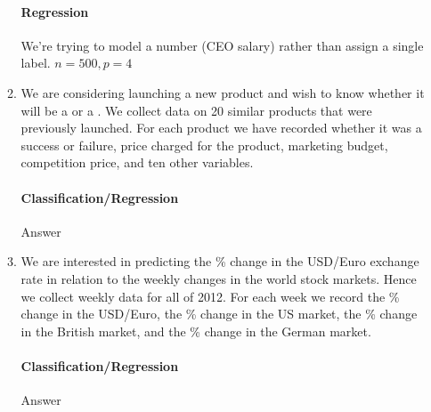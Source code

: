 \documentclass[12pt]{article}
\begin{document}
\begin{enumerate}
\begin{enumerate}
  \paragraph{Regression} We're trying to model a number (CEO salary) rather than
        assign a single label. $n = 500, p = 4$

  \item We are considering launching a new product and wish to know whether it
        will be a  or a . We collect data on 20
        similar products that were previously launched. For each product we have
        recorded whether it was a success or failure, price charged for the product,
        marketing budget, competition price, and ten other variables.\\
  \vspace{-2.5em}
  \paragraph{Classification/Regression} Answer

  \item We are interested in predicting the \% change in the USD/Euro exchange rate
        in relation to the weekly changes in the world stock markets. Hence we collect
        weekly data for all of 2012. For each week we record the \% change in the
        USD/Euro, the \% change in the US market, the \% change in the British market,
        and the \% change in the German market.\\
  \vspace{-2.5em}
  \paragraph{Classification/Regression} Answer
  \end{enumerate}

\end{enumerate}
\end{document}
